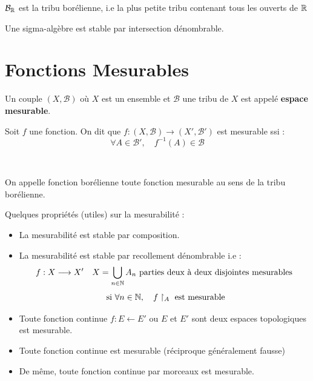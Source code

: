 \begin{example} 
	$\mathcal{B}_{\mathbb{R}}$ est la tribu borélienne, i.e la plus petite tribu contenant tous les ouverts de $\mathbb{R}$
\end{example} 

\begin{prop} 
	Une sigma-algèbre est stable par intersection dénombrable.
\end{prop} 


\section{Fonctions Mesurables} 

Un couple $(X,\mathcal{B})$ où $X$ est un ensemble et $\mathcal{B}$ une tribu de $X$ est appelé \textbf{espace mesurable}.

\begin{definition}
	Soit $f$ une fonction. On dit que $f : (X,\mathcal{B}) \longrightarrow (X',\mathcal{B}')$ est mesurable ssi :
		\[ \boxed{ \forall A \in \mathcal{B}', \quad f^{-1}(A) \in \mathcal{B} } \]
\end{definition} 

\begin{remark}
	On appelle fonction borélienne toute fonction mesurable au sens de la tribu borélienne. 
\end{remark}

\begin{prop}
Quelques propriétés (utiles) sur la mesurabilité :
\begin{itemize} 
	\item La mesurabilité est stable par composition.
	\item La mesurabilité est stable par recollement dénombrable i.e :
		\[ f : X \longrightarrow X' \quad X = \bigcup_{n \in \mathbb{N}} A_n \text{ parties deux à deux disjointes mesurables} \]
		\[ \text{ si } \forall n \in \mathbb{N}, \quad f \restriction_A \text{ est mesurable} \]
	\item Toute fonction continue $f : E \longleftarrow E'$ ou $E$ et $E'$ sont deux espaces topologiques est mesurable.
	\item Toute fonction continue est mesurable (réciproque généralement fausse)
	\item De même, toute fonction continue par morceaux est mesurable.
\end{itemize}
\end{prop}

